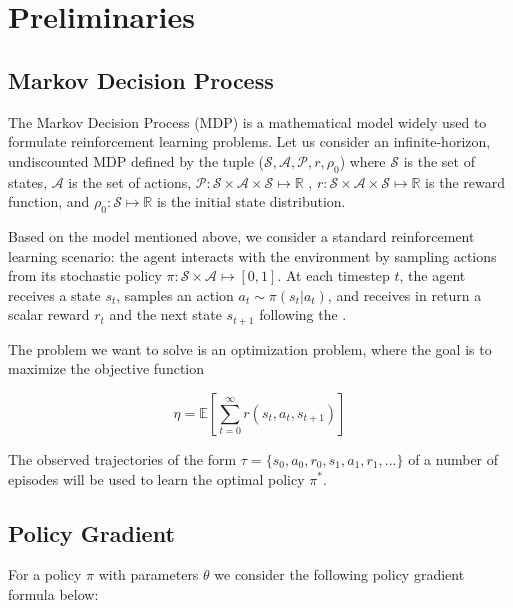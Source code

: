 \section{Preliminaries}
\label{sec:preleminaries}


\subsection{Markov Decision Process}
The Markov Decision Process (MDP) is a mathematical model widely used to formulate reinforcement learning problems. Let us consider an infinite-horizon, undiscounted MDP defined by the tuple ($\mathcal{S}, \mathcal{A}, \mathcal{P}, r, \rho_0$) where $\mathcal{S}$ is the set of states, $\mathcal{A}$ is the set of actions, $\mathcal{P}: \mathcal{S}\times\mathcal{A}\times\mathcal{S}\mapsto \mathbb{R}$ , $r: \mathcal{S}\times\mathcal{A}\times\mathcal{S} \mapsto \mathbb{R}$ is the reward function, and $\rho_0:\mathcal{S}\mapsto\mathbb{R}$ is the initial state distribution.

Based on the model mentioned above, we consider a standard reinforcement learning scenario: the agent interacts with the environment by sampling actions from its stochastic policy $\pi:\mathcal{S}\times\mathcal{A}\mapsto[0,1]$. At each timestep $t$, the agent receives a state $s_t$, samples an action $a_t \sim \pi(s_t | a_t)$, and receives in return a scalar reward $r_t$ and the next state $s_{t+1}$ following the . 

The problem we want to solve is an optimization problem, where the goal is to maximize the objective function 

\[
\eta = \mathbb{E}
\left[ \sum_{t=0}^{\infty}r(s_t, a_t, s_{t+1})\right]
\] 

The observed trajectories of the form $\tau = \{s_0, a_0, r_0, s_1, a_1, r_1, ... \}$ of a number of episodes will be used to learn the optimal policy $\pi^*$. 


\subsection{Policy Gradient}
For a policy $\pi$ with parameters $\theta$ we consider the following policy gradient 
formula below:

